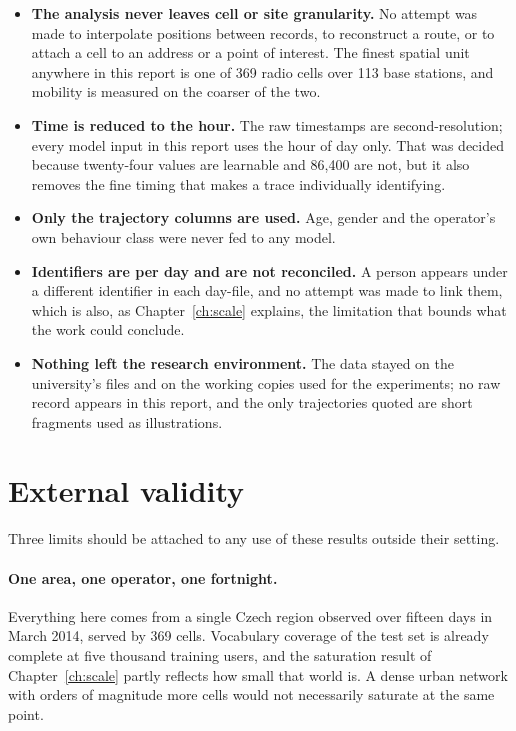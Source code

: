\begin{itemize}
  \item \textbf{The analysis never leaves cell or site granularity.} No attempt
        was made to interpolate positions between records, to reconstruct a route,
        or to attach a cell to an address or a point of interest. The finest
        spatial unit anywhere in this report is one of 369 radio cells over 113
        base stations, and mobility is measured on the coarser of the two.
  \item \textbf{Time is reduced to the hour.} The raw timestamps are
        second-resolution; every model input in this report uses the hour of day
        only. That was decided because twenty-four values are learnable and
        86{,}400 are not, but it also removes the fine timing that makes a trace
        individually identifying.
  \item \textbf{Only the trajectory columns are used.} Age, gender and the
        operator's own behaviour class were never fed to any model.
  \item \textbf{Identifiers are per day and are not reconciled.} A person appears
        under a different identifier in each day-file, and no attempt was made to
        link them, which is also, as Chapter~\ref{ch:scale} explains, the
        limitation that bounds what the work could conclude.
  \item \textbf{Nothing left the research environment.} The data stayed on the
        university's files and on the working copies used for the experiments; no
        raw record appears in this report, and the only trajectories quoted are
        short fragments used as illustrations.
\end{itemize}

\section{External validity}

Three limits should be attached to any use of these results outside their
setting.

\paragraph{One area, one operator, one fortnight.} Everything here comes from a
single Czech region observed over fifteen days in March 2014, served by 369
cells. Vocabulary coverage of the test set is already complete at five thousand
training users, and the saturation result of Chapter~\ref{ch:scale} partly
reflects how small that world is. A dense urban network with orders of magnitude
more cells would not necessarily saturate at the same point.

